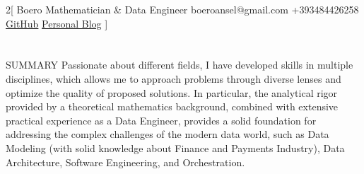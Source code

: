 \documentclass{my_cv}
\begin{document}
\begin{multicols}{2}[
        {Boero}%
        {Mathematician \& Data Engineer}%
        {boeroansel@gmail.com}%
        {+393484426258}%
        {\href{https://github.com/anselboero}{GitHub}}%
        {\href{https://anselboero.com}{Personal Blog}}%
]
\end{multicols}


\section{\faFileText}{SUMMARY}
Passionate about different fields, I have developed skills in multiple disciplines, which allows me to approach problems through diverse lenses and optimize the quality of proposed solutions. In particular, the analytical rigor provided by a theoretical mathematics background, combined with extensive practical experience as a Data Engineer, provides a solid foundation for addressing the complex challenges of the modern data world, such as Data Modeling (with solid knowledge about Finance and Payments Industry), Data Architecture, Software Engineering, and Orchestration. 


\noindent
\hrulefill
\end{document}
